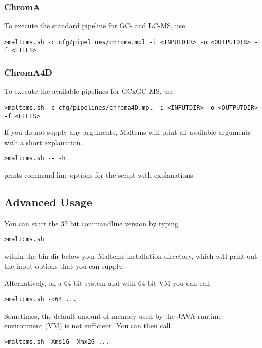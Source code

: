 \subsubsection{ChromA}
To execute the standard pipeline for GC- and LC-MS, use 

\begin{lstlisting}[style=script]
>maltcms.sh -c cfg/pipelines/chroma.mpl -i <INPUTDIR> -o <OUTPUTDIR> -f <FILES>
\end{lstlisting}

\subsubsection{ChromA4D}
To execute the available pipelines for GCxGC-MS, use 

\begin{lstlisting}[style=script]
>maltcms.sh -c cfg/pipelines/chroma4D.mpl -i <INPUTDIR> -o <OUTPUTDIR> -f <FILES>
\end{lstlisting}

If you do not supply any arguments, Maltcms will print all available 
arguments with a short explanation.

\begin{lstlisting}[style=script]
>maltcms.sh -- -h
\end{lstlisting}

prints command-line options for the script with explanations.

\subsection{Advanced Usage}
You can start the 32 bit commandline version by typing

\begin{lstlisting}[style=script]
>maltcms.sh
\end{lstlisting}

within the bin dir below your Maltcms installation directory, which will
print out the input options that you can supply.

Alternatively, on a 64 bit system and with 64 bit VM you can call

\begin{lstlisting}[style=script]
>maltcms.sh -d64 ...
\end{lstlisting}

Sometimes, the default amount of memory used by the JAVA runtime environment (VM) is 
not sufficient. You can then call

\begin{lstlisting}[style=script]
>maltcms.sh -Xms1G -Xmx2G ...
\end{lstlisting}


